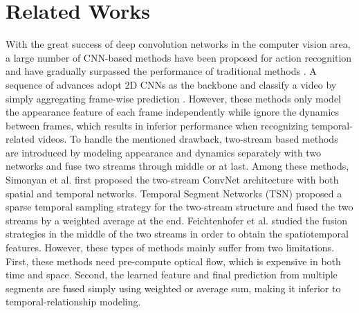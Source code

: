\documentclass[10pt,twocolumn,letterpaper]{article}
\begin{document}
\section{Related Works}
With the great success of deep convolution networks in the computer vision area, a large number of CNN-based methods have been proposed for action recognition and have gradually surpassed the performance of traditional methods \cite{wang2011action,wang2013action}. A sequence of advances adopt 2D CNNs as the backbone and classify a video by simply aggregating frame-wise prediction \cite{KarpathyCVPR14}. However, these methods only model the appearance feature of each frame independently while ignore the dynamics between frames, which results in inferior performance when recognizing temporal-related videos. To handle the mentioned drawback, two-stream based methods \cite{feichtenhofer2016convolutional, wang2016temporal, wang2017spatiotemporal, chen20182, feichtenhofer2017spatiotemporal} are introduced by modeling appearance and dynamics separately with two networks and fuse two streams through middle or at last. Among these methods, Simonyan et al. \cite{simonyan2014two} first proposed the two-stream ConvNet architecture with both spatial and temporal networks. Temporal Segment Networks (TSN) \cite{wang2016temporal} proposed a sparse temporal sampling strategy for the two-stream structure and fused the two streams by a weighted average at the end. Feichtenhofer et al. \cite{feichtenhofer2016spatiotemporal,feichtenhofer2017spatiotemporal} studied the fusion strategies in the middle of the two streams in order to obtain the spatiotemporal features. However, these types of methods mainly suffer from two limitations. First, these methods need pre-compute optical flow, which is expensive in both time and space. Second, the learned feature and final prediction from multiple segments are fused simply using weighted or average sum, making it inferior to temporal-relationship modeling.
\end{document}
